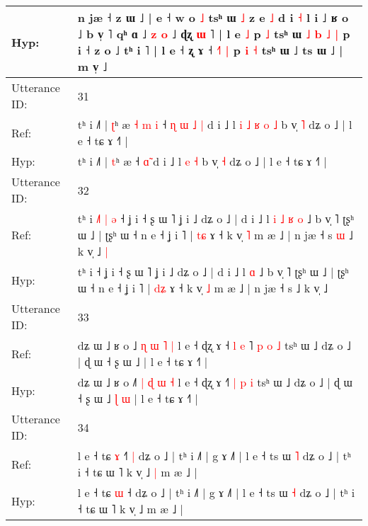 \documentclass[10pt]{article}
\DeclareRobustCommand{\hl}[1]{{\textcolor{red}{#1}}}
\begin{document}
\begin{longtable}{ll}
 \\
Hyp: & n jæ ˧ z ɯ ˩ |\hl{}\hl{} e ˧ w o \hl{˩} tsʰ ɯ \hl{˩} z e\hl{}\hl{} \hl{˩} d i \hl{˧} l i ˩ ʁ o ˩ b v̩ ˥\hl{}\hl{} qʰ ɑ ˩ \hl{z}\hl{ }\hl{o} ˩ ɖʐ \hl{ɯ} ˥ | l e \hl{˩} p\hl{}\hl{} \hl{˩} tsʰ ɯ \hl{˩} \hl{b} \hl{˩} \hl{|} p i ˧ z o ˩\hl{}\hl{} tʰ i \hl{}˥ | l e ˧ \hl{}ʐ ɤ ˧ \hl{}\hl{˧}\hl{˥} \hl{|} p \hl{i} \hl{˧} tsʰ ɯ ˩ ts ɯ ˩ | m v̩ ˩
 \\
\midrule
Utterance ID: & 31 \\
Ref: & tʰ i ˩˥ | \hl{ʈ}ʰ æ\hl{ }\hl{˧}\hl{ }\hl{m}\hl{ }\hl{i} ˧\hl{ }\hl{ɳ}\hl{ }\hl{ɯ} \hl{˩}\hl{ }\hl{|} d i ˩ l\hl{ }\hl{i}\hl{ }\hl{˩}\hl{ }\hl{ʁ} \hl{o} \hl{˩} b v̩ \hl{˥} dʑ o ˩ | l e ˧ tɕ ɤ ˧˥ |
 \\
Hyp: & tʰ i ˩˥ | \hl{t}ʰ æ\hl{}\hl{}\hl{}\hl{}\hl{}\hl{} ˧\hl{}\hl{}\hl{}\hl{} \hl{}\hl{ɑ}\hl{̃} d i ˩ l\hl{}\hl{}\hl{}\hl{}\hl{}\hl{} \hl{e} \hl{˧} b v̩ \hl{˧} dʑ o ˩ | l e ˧ tɕ ɤ ˧˥ |
 \\
\midrule
Utterance ID: & 32 \\
Ref: & tʰ i\hl{ }\hl{˩}\hl{˥}\hl{ }\hl{|}\hl{ }\hl{ə} ˧ ʝ i ˧ ʂ ɯ ˥ ʝ i ˩ dʑ o ˩ | d i ˩ l\hl{ }\hl{i}\hl{ }\hl{˩}\hl{ }\hl{ʁ} \hl{o} ˩ b v̩ ˥ ʈʂʰ ɯ ˩ | ʈʂʰ ɯ ˧ n e ˧ ʝ i ˥ | \hl{t}\hl{ɕ} ɤ ˧ k v̩ \hl{˥} m æ ˩ | n jæ ˧ s\hl{ }\hl{ɯ} ˩ k v̩ ˩\hl{ }\hl{|}
 \\
Hyp: & tʰ i\hl{}\hl{}\hl{}\hl{}\hl{}\hl{}\hl{} ˧ ʝ i ˧ ʂ ɯ ˥ ʝ i ˩ dʑ o ˩ | d i ˩ l\hl{}\hl{}\hl{}\hl{}\hl{}\hl{} \hl{ɑ} ˩ b v̩ ˥ ʈʂʰ ɯ ˩ | ʈʂʰ ɯ ˧ n e ˧ ʝ i ˥ | \hl{d}\hl{ʑ} ɤ ˧ k v̩ \hl{˩} m æ ˩ | n jæ ˧ s\hl{}\hl{} ˩ k v̩ ˩\hl{}\hl{}
 \\
\midrule
Utterance ID: & 33 \\
Ref: & dʑ ɯ ˩ ʁ o ˩\hl{} \hl{ɳ} \hl{ɯ} \hl{˥} \hl{|} l e ˧ ɖʐ ɤ ˧\hl{ }\hl{l}\hl{ }\hl{e}\hl{ }˥ \hl{p} \hl{o} \hl{˩} tsʰ ɯ ˩ dʑ o ˩ | ɖ ɯ ˧ ʂ ɯ ˩\hl{}\hl{}\hl{}\hl{} | l e ˧ tɕ ɤ ˧˥ |
 \\
Hyp: & dʑ ɯ ˩ ʁ o ˩\hl{˥} \hl{|} \hl{ɖ} \hl{ɯ} \hl{˧} l e ˧ ɖʐ ɤ ˧\hl{}\hl{}\hl{}\hl{}\hl{}˥ \hl{|} \hl{p} \hl{i} tsʰ ɯ ˩ dʑ o ˩ | ɖ ɯ ˧ ʂ ɯ ˩\hl{ }\hl{ɭ}\hl{ }\hl{ɯ} | l e ˧ tɕ ɤ ˧˥ |
 \\
\midrule
Utterance ID: & 34 \\
Ref: & l e ˧ tɕ \hl{ɤ} ˧\hl{˥}\hl{ }\hl{|} dʑ o ˩ | tʰ i ˩˥ | g ɤ ˩˥ | l e ˧ ts ɯ \hl{˥} dʑ o ˩ | tʰ i ˧ tɕ ɯ ˥ k v̩ ˩\hl{ }\hl{|} m æ ˩ |
 \\
Hyp: & l e ˧ tɕ \hl{ɯ} ˧\hl{}\hl{}\hl{} dʑ o ˩ | tʰ i ˩˥ | g ɤ ˩˥ | l e ˧ ts ɯ \hl{˧} dʑ o ˩ | tʰ i ˧ tɕ ɯ ˥ k v̩ ˩\hl{}\hl{} m æ ˩ |
 \\
\midrule

\end{longtable}
\end{document}
